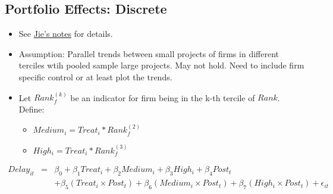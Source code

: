 \documentclass[
]{article}
\providecommand{\tightlist}{%
  \setlength{\itemsep}{0pt}\setlength{\parskip}{0pt}}
\begin{document}
\hypertarget{portfolio-effects-discrete}{%
\subsection{Portfolio Effects:
Discrete}\label{portfolio-effects-discrete}}

\begin{itemize}
\tightlist
\item
  See
  \href{https://github.com/QuickPay-Operational-Performance/Data-and-code/blob/master/notes/Portfolio\%20model\%2B0308.pdf}{Jie's
  notes} for details.
\item
  Assumption: Parallel trends between small projects of firms in
  different terciles wtih pooled sample large projects. May not hold.
  Need to include firm specific control or at least plot the trends.
\item
  Let \(Rank_f^{(k)}\) be an indicator for firm being in the k-th
  tercile of \(Rank\). Define:

  \begin{itemize}
  \tightlist
  \item
    \(Medium_i = Treat_i * Rank_f^{(2)}\)
  \item
    \(High_i = Treat_i * Rank_f^{(3)}\)
  \end{itemize}
\end{itemize}

\[\begin{aligned} Delay_{it} &=& \beta_0+\beta_1 Treat_i + \beta_2 Medium_i+\beta_3 High_i +\beta_4 Post_t\\ && +\beta_5( Treat_i\times Post_t) + \beta_6(Medium_i\times Post_t) + \beta_7(High_i\times Post_t) + \epsilon_{it} \end{aligned}\]
\end{document}
